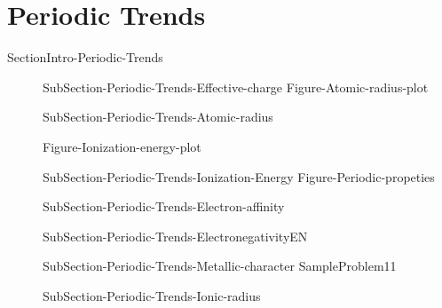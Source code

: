 \documentclass[main.tex]{subfiles}
\newcommand\chapterlabel{Ch-Table}\setcounter{figurenewcounter}{0}\setcounter{tablenewcounter}{0}\setcounter{formulanewcounter}{0}\chapterpicture{../{\chapterlabel}/figure1}\chapterpicturelabel{PxFuel}
\begin{document}
{\vspace{-1cm}{Figure-Atomic-radius}

\section{Periodic Trends}{SectionIntro-Periodic-Trends}
\sloppy\begin{description}
\item[] {SubSection-Periodic-Trends-Effective-charge}
{Figure-Atomic-radius-plot}
\item[] {SubSection-Periodic-Trends-Atomic-radius}
 \hspace{-5cm}{Table-Ionization-energies}

{Figure-Ionization-energy-plot}
\item[] {SubSection-Periodic-Trends-Ionization-Energy}
{Figure-Periodic-propeties}
\item[] {SubSection-Periodic-Trends-Electron-affinity}
\item[] {SubSection-Periodic-Trends-ElectronegativityEN}
\item[]{SubSection-Periodic-Trends-Metallic-character}
{SampleProblem11}
\item[]  {SubSection-Periodic-Trends-Ionic-radius}
\end{description}



\renewcommand\chapterlabel{Ch-Table}
}{}






 \checkoddpage\ifoddpage \clearpage\thispagestyle{empty}\mbox{}\clearpage \else  \fi 
\end{document}
